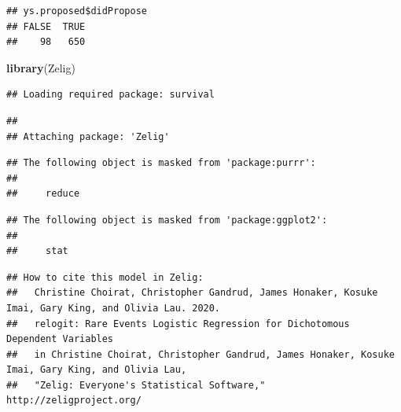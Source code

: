\documentclass[
]{article}
\newenvironment{Shaded}{\begin{snugshade}}{\end{snugshade}}
\newcommand{\DataTypeTok}[1]{\textcolor[rgb]{0.13,0.29,0.53}{#1}}
\newcommand{\DecValTok}[1]{\textcolor[rgb]{0.00,0.00,0.81}{#1}}
\newcommand{\FloatTok}[1]{\textcolor[rgb]{0.00,0.00,0.81}{#1}}
\newcommand{\KeywordTok}[1]{\textcolor[rgb]{0.13,0.29,0.53}{\textbf{#1}}}
\newcommand{\NormalTok}[1]{#1}
\newcommand{\OperatorTok}[1]{\textcolor[rgb]{0.81,0.36,0.00}{\textbf{#1}}}
\newcommand{\OtherTok}[1]{\textcolor[rgb]{0.56,0.35,0.01}{#1}}
\newcommand{\StringTok}[1]{\textcolor[rgb]{0.31,0.60,0.02}{#1}}
\begin{document}
\begin{verbatim}
## ys.proposed$didPropose
## FALSE  TRUE 
##    98   650
\end{verbatim}

\begin{Shaded}
\begin{Highlighting}[]
\KeywordTok{library}\NormalTok{(Zelig)}
\end{Highlighting}
\end{Shaded}

\begin{verbatim}
## Loading required package: survival
\end{verbatim}

\begin{verbatim}
## 
## Attaching package: 'Zelig'
\end{verbatim}

\begin{verbatim}
## The following object is masked from 'package:purrr':
## 
##     reduce
\end{verbatim}

\begin{verbatim}
## The following object is masked from 'package:ggplot2':
## 
##     stat
\end{verbatim}

\begin{Shaded}
\end{Shaded}

\begin{verbatim}
## How to cite this model in Zelig:
##   Christine Choirat, Christopher Gandrud, James Honaker, Kosuke Imai, Gary King, and Olivia Lau. 2020.
##   relogit: Rare Events Logistic Regression for Dichotomous Dependent Variables
##   in Christine Choirat, Christopher Gandrud, James Honaker, Kosuke Imai, Gary King, and Olivia Lau,
##   "Zelig: Everyone's Statistical Software," http://zeligproject.org/
\end{verbatim}
\end{document}
